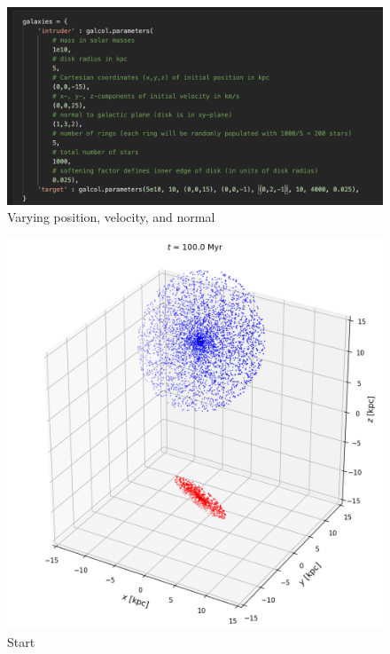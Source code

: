 \documentclass[linenumbers,RNAAS,trackchanges]{aastex631}
\begin{document}
\begin{figure}[H]
    \centering
    \includegraphics[scale=.60]{comparison_galaxy/ARP_66_vars.png}
    \caption{Varying position, velocity, and normal}
    \label{fig:code}
\end{figure}
\newpage
\begin{figure}[H]
    \centering
    \includegraphics[scale=.40]{comparison_galaxy/ARP_66_input.png}
    \caption{Start}
    \label{fig:code}
\end{figure}
\end{document}
